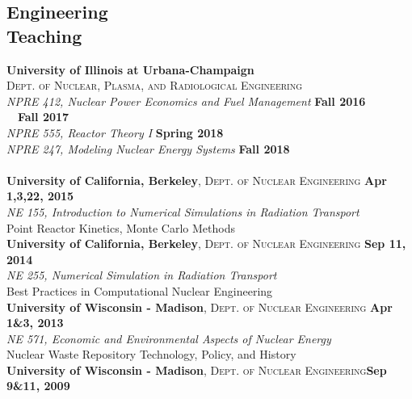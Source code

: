 \documentclass[margin,line]{resume}
\begin{document}
\begin{resume}
    \section{\mysidestyle Engineering\\Teaching}
    \textbf{University of Illinois at Urbana-Champaign}\\
    \textsc{Dept. of Nuclear, Plasma, and Radiological Engineering}\\
               \textsl{NPRE 412, Nuclear Power Economics and Fuel Management} \hfill \textbf{Fall 2016}\\
               \mbox{ }~\hfill \textbf{Fall 2017}\\
               \textsl{NPRE 555, Reactor Theory I} \hfill \textbf{Spring 2018}\\
               \textsl{NPRE 247, Modeling Nuclear Energy Systems} \hfill \textbf{Fall 2018}\\
               \vspace{2mm}\\
    \textbf{University of California, Berkeley}, \textsc{Dept. of Nuclear Engineering} \hfill \textbf{Apr 1,3,22, 2015}\\
               \textsl{NE 155, Introduction to Numerical Simulations in Radiation Transport}\\
               Point Reactor Kinetics, Monte Carlo Methods
               \vspace{2mm}\\
    \textbf{University of California, Berkeley}, \textsc{Dept. of Nuclear Engineering} \hfill \textbf{Sep 11, 2014}\\
               \textsl{NE 255, Numerical Simulation in Radiation Transport}\\
               Best Practices in Computational Nuclear Engineering
               \vspace{2mm}\\
    \textbf{University of Wisconsin - Madison}, \textsc{Dept. of Nuclear Engineering} \hfill \textbf{Apr 1\&3, 2013}\\
               \textsl{NE 571, Economic and Environmental Aspects of Nuclear Energy}\\
               Nuclear Waste Repository Technology, Policy, and History
               \vspace{2mm}\\
    \textbf{University of Wisconsin - Madison}, \textsc{Dept. of Nuclear Engineering}\hfill \textbf{Sep 9\&11, 2009}\\

\end{resume}
\end{document}
